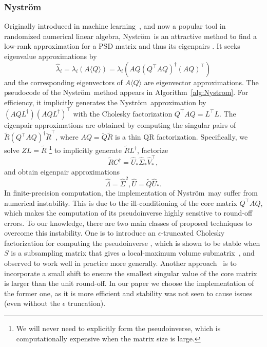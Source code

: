 \documentclass[onefignum,onetabnum]{siamart251216}
\def\Nystrom{Nystr{\"o}m}
\begin{document}
\subsubsection{\Nystrom}
Originally introduced in machine learning~\cite{williams2000using}, and now a popular tool in randomized numerical linear algebra, \Nystrom\ is an attractive method to find a low-rank approximation for a PSD matrix and thus its eigenpairs \cite{halko2011finding, martinsson2020randomized, nakatsukasa2020sharp, tropp2023randomized}. It seeks eigenvalue approximations by
\[
    \hat{\lambda}_i = \lambda_i \left(A \langle Q \rangle\right) = \lambda_i\left(AQ (Q^\top A Q)^{\dagger} (AQ)^\top\right)
\]
and the corresponding eigenvectors of $A \langle Q \rangle$ are eigenvector approximations. The pseudocode of the \Nystrom\ method appears in Algorithm~\ref{alg:Nystrom}. For efficiency, it implicitly generates the \Nystrom\ approximation by $(AQL^{\dagger})(AQL^{\dagger})^\top$ with the Cholesky factorization $Q^\top A Q = L^\top L$. The eigenpair approximations are obtained by computing the singular pairs of $\widetilde{R}(Q^\top A Q)^{\dagger}\widetilde{R}^\top$, where $AQ = \widetilde{Q} \widetilde{R}$ is a thin QR factorization. Specifically, we solve $ZL = \widetilde{R}$ \footnote{We will never need to explicitly form the pseudoinverse, which is computationally expensive when the matrix size is large.} to implicitly generate $\tilde{R} L^{\dagger}$, factorize
\[
    \widetilde{R} C^{\dagger} = \widehat{U}_{*} \widehat{\Sigma}_* \widehat{V}_{*}^\top,
\]
and obtain eigenpair approximations 
\[
    \hat{\Lambda} = \widehat{\Sigma}^2, \hat{U} = \widetilde{Q} \widehat{U}_{*}.
\]
In finite-precision computation, the implementation of \Nystrom\ may suffer from numerical instability. This is due to the ill-conditioning of the core matrix $Q^\top A Q$, which makes the computation of its pseudoinverse highly sensitive to round-off errors. To our knowledge, there are two main classes of proposed techniques to overcome this instability. One is to introduce an $\epsilon$-truncated Cholesky factorization for computing the pseudoinverse \cite{bucci2025numerical}, which is shown to be stable when $S$ is a subsampling matrix that gives a local-maximum volume submatrix~\cite{damle2025estimating}, and observed to work well in practice more generally.  Another approach~\cite{tropp2017fixed} is to incorporate a small shift to ensure the smallest singular value of the core matrix is larger than the unit round-off. In our paper we choose the implementation of the former one, as it is more efficient and stability was not seen to cause issues (even without the $\epsilon$ truncation).
\end{document}
